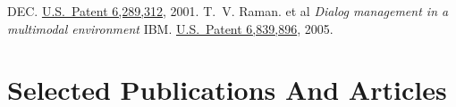 \documentclass{article}
\begin{document}
\begin{plainbibliography}{}
\newblock DEC.  
\newblock
  \href{http://patft.uspto.gov/netacgi/nph-Parser?Sect1=PTO1&Sect2=HITOFF&d=PALL&p=1&u=/netahtml/srchnum.htm&r=1&f=G&l=50&s1='6289312'.WKU.&OS=PN/6289312&RS=PN/6289312}
  {U.S.\ Patent 6,289,312},  2001.
 T.~V. Raman.  et al 
\newblock
  \emph{Dialog management  in a
multimodal environment}
\newblock IBM.  
\newblock
  \href{http://patft.uspto.gov/netacgi/nph-Parser?Sect1=PTO1\&Sect2=HITOFF\&d=PALL\&p=1\&u=/netahtml/srchnum.htm\&r=1\&f=G\&l=50\&s1=6839896.WKU.\&OS=PN/6839896\&RS=PN/6839896}
  {U.S.\ Patent 6,839,896},  2005.
\end{plainbibliography}

\section*{Selected Publications And Articles}
\end{document}
